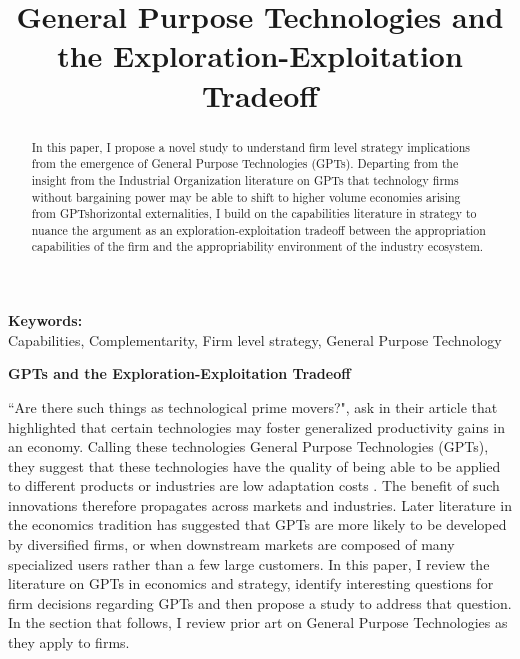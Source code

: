 \documentclass[12pt,letterpaper]{article}
\begin{document}
\title{General Purpose Technologies and the Exploration-Exploitation Tradeoff}
\date{}
\maketitle
\thispagestyle{empty}
\renewcommand{\abstractname}{\normalsize ABSTRACT}
\begin{abstract} 
\normalsize 
In this paper, I propose a novel study to understand firm level strategy implications from the emergence of General Purpose Technologies (GPTs). Departing from the insight from the Industrial Organization literature on GPTs that technology firms without bargaining power may be able to shift to higher volume economies arising from GPTs\textquotesingle horizontal externalities, I build on the capabilities literature in strategy to nuance the argument as an exploration-exploitation tradeoff between the appropriation capabilities of the firm and the appropriability environment of the industry ecosystem.
\end{abstract}


{\textbf{Keywords:} \\\indent Capabilities, Complementarity, Firm level strategy, General Purpose Technology}

\newpage
\pagestyle{fancy}
\fancyhf{}
\rhead{\thepage}

\begin{center}
\textbf{GPTs and the Exploration-Exploitation Tradeoff}
\end{center}
``Are there such things as \textquotesingle technological prime movers\textquotesingle ?", ask \cite{Bresnahan1995} in their article that highlighted that certain technologies may foster generalized productivity gains in an economy. Calling these technologies General Purpose Technologies (GPTs), they suggest that these technologies have the quality of being able to be applied to different products or industries are low adaptation costs \citep{Rosenberg2004}. The benefit of such innovations therefore propagates across markets and industries. Later literature in the economics tradition has suggested that GPTs are more likely to be developed by diversified firms, or when downstream markets are composed of many specialized users rather than a few large customers.  In this paper, I review the literature on GPTs in economics and strategy, identify interesting questions for firm decisions regarding GPTs and then propose a study to address that question. In the section that follows, I review prior art on General Purpose Technologies as they apply to firms.
\end{document}
